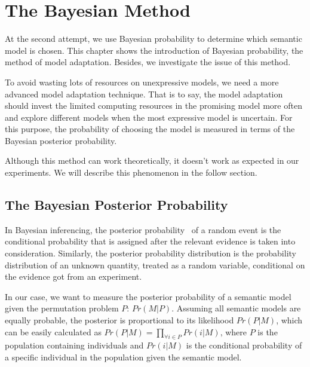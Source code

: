 \section{The Bayesian Method}
At the second attempt, we use Bayesian probability to determine which semantic model is chosen. This chapter shows the introduction of Bayesian probability, the method of model adaptation. Besides, we investigate the issue of this method.

To avoid wasting lots of resources on unexpressive models, we need a more advanced model adaptation technique. That is to say, the model adaptation should invest the limited computing resources in the promising model more often and explore different models when the most expressive model is uncertain. For this purpose, the probability of choosing the model is measured in terms of the Bayesian posterior probability.

Although this method can work theoretically, it doesn't work as expected in our experiments. We will describe this phenomenon in the follow section.

 
\subsection{The Bayesian Posterior Probability}
In Bayesian inferencing, the posterior probability~\citep{lee2012bayesian} of a random event is the conditional probability that is assigned after the relevant evidence is taken into consideration. Similarly, the posterior probability distribution is the probability distribution of an unknown quantity, treated as a random variable, conditional on the evidence got from an experiment.


In our case, we want to measure the posterior probability of a semantic model given the permutation problem $P$: $Pr(M|P)$. Assuming all semantic models are equally probable, the posterior is proportional to its likelihood $Pr(P | M)$, which can be easily calculated as $ Pr(P | M) =
    \prod_{\forall i \in P}{Pr(i|M)}\text{,}$ 
where $P$ is the population containing individuals and $Pr(i|M)$ is the conditional probability of a specific individual in the population given the semantic model. 



